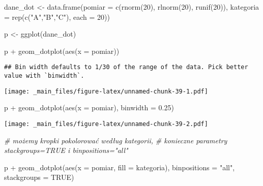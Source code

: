 \documentclass[
]{book}
\newenvironment{Shaded}{\begin{snugshade}}{\end{snugshade}}
\newcommand{\AttributeTok}[1]{\textcolor[rgb]{0.77,0.63,0.00}{#1}}
\newcommand{\CommentTok}[1]{\textcolor[rgb]{0.56,0.35,0.01}{\textit{#1}}}
\newcommand{\ConstantTok}[1]{\textcolor[rgb]{0.00,0.00,0.00}{#1}}
\newcommand{\DecValTok}[1]{\textcolor[rgb]{0.00,0.00,0.81}{#1}}
\newcommand{\FloatTok}[1]{\textcolor[rgb]{0.00,0.00,0.81}{#1}}
\newcommand{\FunctionTok}[1]{\textcolor[rgb]{0.00,0.00,0.00}{#1}}
\newcommand{\NormalTok}[1]{#1}
\newcommand{\OtherTok}[1]{\textcolor[rgb]{0.56,0.35,0.01}{#1}}
\newcommand{\SpecialCharTok}[1]{\textcolor[rgb]{0.00,0.00,0.00}{#1}}
\newcommand{\StringTok}[1]{\textcolor[rgb]{0.31,0.60,0.02}{#1}}
\begin{document}
\begin{Shaded}
\begin{Highlighting}[]
\NormalTok{dane\_dot }\OtherTok{\textless{}{-}} \FunctionTok{data.frame}\NormalTok{(}\AttributeTok{pomiar =} \FunctionTok{c}\NormalTok{(}\FunctionTok{rnorm}\NormalTok{(}\DecValTok{20}\NormalTok{), }\FunctionTok{rlnorm}\NormalTok{(}\DecValTok{20}\NormalTok{), }\FunctionTok{runif}\NormalTok{(}\DecValTok{20}\NormalTok{)), }
                       \AttributeTok{kategoria =} \FunctionTok{rep}\NormalTok{(}\FunctionTok{c}\NormalTok{(}\StringTok{"A"}\NormalTok{,}\StringTok{"B"}\NormalTok{,}\StringTok{"C"}\NormalTok{), }\AttributeTok{each =} \DecValTok{20}\NormalTok{))}

\NormalTok{p }\OtherTok{\textless{}{-}} \FunctionTok{ggplot}\NormalTok{(dane\_dot)}

\NormalTok{p }\SpecialCharTok{+} \FunctionTok{geom\_dotplot}\NormalTok{(}\FunctionTok{aes}\NormalTok{(}\AttributeTok{x =}\NormalTok{ pomiar))}
\end{Highlighting}
\end{Shaded}

\begin{verbatim}
## Bin width defaults to 1/30 of the range of the data. Pick better value with `binwidth`.
\end{verbatim}

\texttt{[image: \_main\_files/figure-latex/unnamed-chunk-39-1.pdf]}

\begin{Shaded}
\begin{Highlighting}[]
\NormalTok{p }\SpecialCharTok{+} \FunctionTok{geom\_dotplot}\NormalTok{(}\FunctionTok{aes}\NormalTok{(}\AttributeTok{x =}\NormalTok{ pomiar), }\AttributeTok{binwidth =} \FloatTok{0.25}\NormalTok{)}
\end{Highlighting}
\end{Shaded}

\texttt{[image: \_main\_files/figure-latex/unnamed-chunk-39-2.pdf]}

\begin{Shaded}
\begin{Highlighting}[]
\CommentTok{\# możemy kropki pokolorować według kategorii, }
\CommentTok{\# konieczne parametry stackgroups=TRUE i binpositions="all"}

\NormalTok{p }\SpecialCharTok{+} \FunctionTok{geom\_dotplot}\NormalTok{(}\FunctionTok{aes}\NormalTok{(}\AttributeTok{x =}\NormalTok{ pomiar, }\AttributeTok{fill =}\NormalTok{ kategoria), }\AttributeTok{binpositions =} \StringTok{"all"}\NormalTok{, }\AttributeTok{stackgroups =} \ConstantTok{TRUE}\NormalTok{)}
\end{Highlighting}
\end{Shaded}
\end{document}
